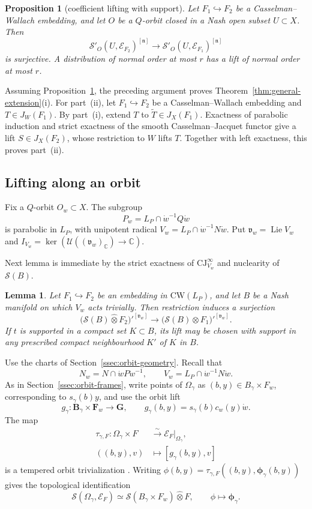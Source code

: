 \documentclass[a4paper,12pt]{amsart}
\numberwithin{equation}{section}
\newtheorem{proposition}[theorem]{Proposition}
\newtheorem{lemma}[theorem]{Lemma}
\theoremstyle{definition}
\theoremstyle{remark}
\newcommand{\G}{\mathbf G}
\newcommand{\F}{\mathbf F}
\newcommand{\B}{\mathbf B}
\newcommand{\C}{\mathbb C}
\newcommand{\fn}{\mathfrak n}
\newcommand{\mcU}{\mathcal U}
\newcommand{\mcS}{\mathcal S}
\newcommand{\mcE}{\mathcal E}
\newcommand{\Lie}{\operatorname{Lie}}
\begin{document}
\begin{proposition}[coefficient lifting with support]\label{prop:coefficient-supported}
Let $F_1\hookrightarrow F_2$ be a Casselman--Wallach embedding, and let $O$ be a $Q$-orbit closed in a Nash open subset $U\subset X$. Then
\[
 \mcS'_O(U,\mcE_{F_2})^{[\fn]}\longrightarrow
 \mcS'_O(U,\mcE_{F_1})^{[\fn]}
\]
is surjective. A distribution of normal order at most $r$ has a lift of normal order at most $r$.
\end{proposition}

Assuming Proposition~\ref{prop:coefficient-supported}, the preceding argument proves Theorem~\ref{thm:general-extension}(i). For part~(ii), let $F_1\hookrightarrow F_2$ be a Casselman--Wallach embedding and $T\in J_W(F_1)$. By part~(i), extend $T$ to $\widetilde T\in J_X(F_1)$. Exactness of parabolic induction and strict exactness of the smooth Casselman--Jacquet functor give a lift $S\in J_X(F_2)$, whose restriction to $W$ lifts $T$. Together with left exactness, this proves part~(ii).


\subsection{Lifting along an orbit}\label{ssec:orbit-lifting}

Fix a $Q$-orbit $O_w\subset X$. The subgroup
\[
 P_w=L_P\cap\dot w^{-1}Q\dot w
\]
is parabolic in $L_P$, with unipotent radical $V_w=L_P\cap\dot w^{-1}N\dot w$. Put $\mathfrak v_w=\Lie V_w$ and $I_{V_w}=\ker(\mcU((\mathfrak v_w)_\C)\to\C)$.

Next lemma is immediate by the strict exactness of $\mathrm{CJ}^{\infty}_{V_w}$ and nuclearity of $\mcS(B)$.
\begin{lemma}\label{lem:passive-jacquet}
Let $F_1\hookrightarrow F_2$ be an embedding in $\mathrm{CW}(L_P)$, and let $B$ be a Nash manifold on which $V_w$ acts trivially. Then restriction induces a surjection
\[
 \bigl(\mcS(B)\widehat\otimes F_2\bigr)'^{[\mathfrak v_w]}
 \longrightarrow
 \bigl(\mcS(B)\widehat\otimes F_1\bigr)'^{[\mathfrak v_w]}.
\]
If $t$ is supported in a compact set $K\subset B$, its lift may be chosen with support in any prescribed compact neighbourhood $K'$ of $K$ in $B$.
\end{lemma}


Use the charts of Section~\ref{ssec:orbit-geometry}. Recall that
\[
 N_w=N\cap\dot wP\dot w^{-1},\qquad
 V_w=L_P\cap\dot w^{-1}N\dot w.
\]
As in Section~\ref{ssec:orbit-frames}, write points of $\Omega_\gamma$ as $(b,y)\in B_\gamma\times F_w$, corresponding to $s_\gamma(b)y$, and use the orbit lift
\[
 g_\gamma:\B_\gamma\times\F_w\longrightarrow\G,
 \qquad g_\gamma(b,y)=s_\gamma(b)c_w(y)\dot w.
\]
The map
\[
 \begin{aligned}
 \tau_{\gamma,F}:\Omega_\gamma\times F
 &\xrightarrow{\sim}\mcE_F|_{\Omega_\gamma},\\
 ((b,y),v)&\longmapsto[g_\gamma(b,y),v]
 \end{aligned}
\]
is a tempered orbit trivialization \cite[Section~3.3]{CS21}. Writing
$\phi(b,y)=\tau_{\gamma,F}((b,y),\boldsymbol\phi_\gamma(b,y))$ gives the topological identification
\[
 \mcS(\Omega_\gamma,\mcE_F)
 \simeq\mcS(B_\gamma\times F_w)\widehat\otimes F,
 \qquad\phi\longmapsto\boldsymbol\phi_\gamma.
\]
\end{document}
